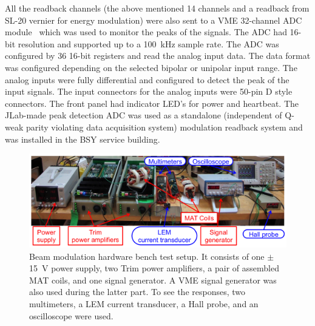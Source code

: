 All the readback channels (the above mentioned 14 channels and a readback from SL-20 vernier for energy modulation) were also sent to a VME 32-channel ADC module~\cite{JLab_ADC} which was used to monitor the peaks of the signals.
The ADC had 16-bit resolution and supported up to a 100~kHz sample rate. The ADC was configured by 36 16-bit registers and read the analog input data. The data format was configured depending on the selected bipolar or unipolar input range. The analog inputs were fully differential and configured to detect the peak of the input signals. The input connectors for the analog inputs were 50-pin D style connectors. The front panel had indicator LED's for power and heartbeat. 
The JLab-made peak detection ADC was used as a standalone (independent of Q-weak parity violating data acquisition system) modulation readback system and was installed in the BSY service building.

\begin{singlespace}
\begin{figure}[!h]
	\begin{center}
	\includegraphics[width=15.0cm]{figures/BModTestHardware}
	\end{center}
	\caption
	{Beam modulation hardware bench test setup. It consists of one $\pm$15~V power supply, two Trim power amplifiers, a pair of assembled MAT coils, and one signal generator. A VME signal generator was also used during the latter part. To see the responses, two multimeters, a LEM current transducer, a Hall probe, and an oscilloscope were used. }
	\label{fig:BModTestHardware}
\end{figure}
\end{singlespace}

